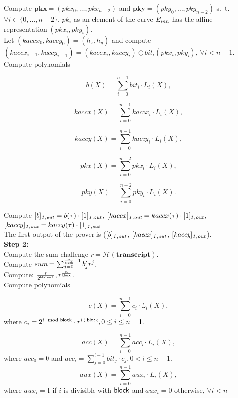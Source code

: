 \noindent Compute $\mathbf{pkx} = (\mathit{pkx_0}, \ldots, \mathit{pkx_{n-2}})$ and $\mathbf{pky} = (\mathit{pky_0}, \ldots, \mathit{pky_{n-2}})$ s.\ t.\  
$\forall i \in \{0, \ldots, n-2\}$, $\mathit{pk_i}$ as an element of the curve $\mathit{E}_{\mathit{inn}}$ has the affine representation $(\mathit{pkx_i}, \mathit{pky_i})$. \\

\noindent Let $(kaccx_{0}, kaccy_{0}) = (h_x, h_y)$ and 
compute $(kaccx_{i+1}, kaccy_{i+1}) =  (kaccx_{i}, kaccy_{i}) \oplus \mathit{bit_i}(pkx_{i}, pky_{i})$, $\forall i < n-1$. \\ 

\noindent Compute polynomials 

$$b(X) = \sum_{i=0}^{n-1} \mathit{bit_i} \cdot L_i(X),$$

$$kaccx(X) = \sum_{i=0}^{n-1} kaccx_i \cdot L_i(X),$$

$$kaccy(X) = \sum_{i=0}^{n-1} kaccy_i \cdot L_i(X),$$

$$pkx(X) = \sum_{i=0}^{n-2} pkx_i \cdot L_i(X),$$

$$pky(X) = \sum_{i=0}^{n-2} pky_i \cdot L_i(X).$$

\noindent Compute $[b]_{\mathit{1,out}} = b(\tau)\cdot[1]_{\mathit{1,out}}$, $[kaccx]_{\mathit{1,out}} = kaccx(\tau) \cdot [1]_{\mathit{1,out}}$, $[kaccy]_{\mathit{1,out}} = kaccy(\tau)\cdot [1]_{\mathit{1,out}}$. \\

\noindent The first output of the prover is ($[b]_{\mathit{1,out}}$, $[kaccx]_{\mathit{1,out}}$, $[kaccy]_{\mathit{1,out}}$). \\

\noindent \textbf{Step 2:} \\
\noindent Compute the sum challenge $r = \mathcal{H}(\mathbf{transcript})$. \\

\noindent Compute $sum = \sum_{j=0}^{\frac{n}{\mathsf{block}}-1} b'_{j} r^j$.\\

\noindent Compute: $\frac{r}{2^{\mathsf{block} -1}}, r^{\frac{n}{\mathsf{block}}}$. \\

\noindent Compute polynomials 

$$c(X) = \sum_{i=0}^{n-1} c_i \cdot L_{i}(X),$$ 
where $c_i =  2^{i\mod {\mathsf{block}}}\cdot r^{i\div \mathsf{block}}, 0 \leq i \leq n-1 $. 

$$acc(X) = \sum_{i=0}^{n-1} acc_i \cdot L_{i}(X),$$ 
where $acc_0 = 0$ and $acc_i = \sum_{j=0}^{i-1} \mathit{bit_j} \cdot c_j, 0 < i \leq n-1$. 
$$aux(X) = \sum_{i=0}^{n-1} aux_i \cdot L_{i}(X),$$
where $aux_{i} = 1$ if $i$ is divisible with $\mathsf{block}$ and $aux_{i} = 0$ otherwise, $\forall i < n$ \\

